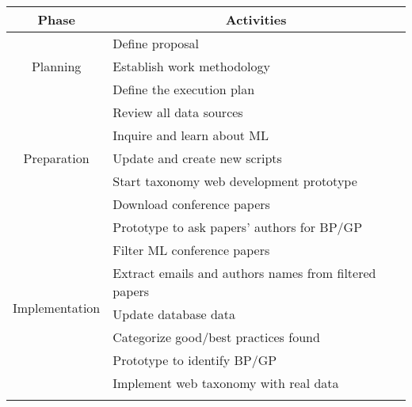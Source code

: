 \documentclass[conference]{IEEEtran}
\begin{document}
\begingroup
\setlength{\tabcolsep}{10pt} %
\renewcommand{\arraystretch}{1.5} %
\begin{table}[htb]
\normalsize
\begin{center}
\begin{tabular}{|l|p{4.8cm}|}
\hline
\multicolumn{1}{|c|}{Phase}                                                           
& \multicolumn{1}{c|}{Activities}        \\ \hline
\multicolumn{1}{|c|}{\multirow{3}{*}{Planning}}                                       
& Define proposal                        \\ \cline{2-2} 
\multicolumn{1}{|c|}{}                                                                
& Establish work methodology              \\ \cline{2-2} 
\multicolumn{1}{|c|}{}                                                                
& Define the execution plan              \\ \hline
\multicolumn{1}{|c|}{\multirow{5}{*}{Preparation}}                                    
& Review all data sources                \\ \cline{2-2} 
\multicolumn{1}{|c|}{}                                                                
& Inquire and learn about ML             \\ \cline{2-2} 
\multicolumn{1}{|c|}{}                                                                
& Update and create new scripts          \\ \cline{2-2} 
\multicolumn{1}{|c|}{}                                                                
& Start taxonomy web development prototype         \\ \cline{2-2} 
\multicolumn{1}{|c|}{}                                                                
& Download conference papers             \\ \hline
\multirow{11}{*}{Implementation} 
& Prototype to ask papers' authors for BP/GP \\ \cline{2-2} 
& Filter \ac{ML}     conference papers \\ \cline{2-2} 
& Extract emails and authors names from filtered papers \\ \cline{2-2} 
& Update database data \\ \cline{2-2} 
& Categorize good/best practices found  \\ \cline{2-2}    
& Prototype to identify BP/GP            \\ \cline{2-2} 
& Implement web taxonomy with real data  \\ \cline{2-2} 

\end{tabular}
\end{center}
\end{table}
\end{document}
